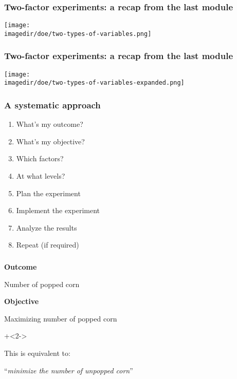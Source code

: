 \begin{frame}\frametitle{Two-factor experiments: a recap from the last module}
    \texttt{[image: \\imagedir/doe/two-types-of-variables.png]}
\end{frame}

\begin{frame}\frametitle{Two-factor experiments: a recap from the last module}
    \texttt{[image: \\imagedir/doe/two-types-of-variables-expanded.png]}
\end{frame}

{
\begin{frame}\frametitle{}
	\vspace{-5cm}
\end{frame}}

\begin{frame}\frametitle{A systematic approach}
	 \begin{enumerate}
	 	\item	What's my outcome? \pause
	 	\item	What's my objective? \pause
	 	\item	Which factors? \pause
		\item	At what levels?\pause
	 	\item	Plan the experiment \pause
	 	\item	Implement the experiment\pause
	 	\item	Analyze the results\pause
		\item	Repeat (if required)
	 \end{enumerate}
	 \vspace{5cm}
\end{frame}

{
\begin{frame}\frametitle{}
	
	{\color{white}
		\textbf{Outcome}
		
		\qquad Number of popped corn
		
		\vspace{18pt}
		
		\textbf{Objective}
		
		\qquad Maximizing number of popped corn
	

		\vspace{12pt}
		\onslide+<2->{
			This is equivalent to:

			``\emph{minimize the number of unpopped corn}''
		}

	}
	\vspace{4cm}
\end{frame}}

